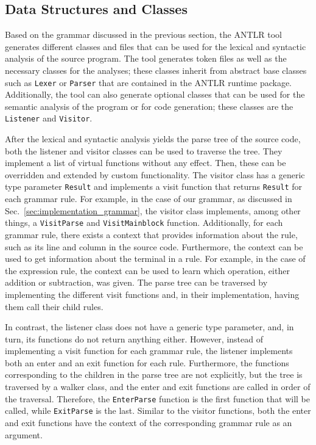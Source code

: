 \subsection{Data Structures and Classes}
\label{sec:implementation_syntax_dataStructuresClasses}
Based on the grammar discussed in the previous section, the ANTLR tool generates different classes and files that can be used for the lexical and syntactic analysis of the source program. The tool generates token files as well as the necessary classes for the analyses; these classes inherit from abstract base classes such as \texttt{Lexer} or \texttt{Parser} that are contained in the ANTLR runtime package. Additionally, the tool can also generate optional classes that can be used for the semantic analysis of the program or for code generation; these classes are the \texttt{Listener} and \texttt{Visitor}.

After the lexical and syntactic analysis yields the parse tree of the source code, both the listener and visitor classes can be used to traverse the tree. They implement a list of virtual functions without any effect. Then, these can be overridden and extended by custom functionality. The visitor class has a generic type parameter \texttt{Result} and implements a visit function that returns \texttt{Result} for each grammar rule. For example, in the case of our grammar, as discussed in Sec.~\ref{sec:implementation_grammar}, the visitor class implements, among other things, a \texttt{VisitParse} and \texttt{VisitMainblock} function.
Additionally, for each grammar rule, there exists a context that provides information about the rule, such as its line and column in the source code. Furthermore, the context can be used to get information about the terminal in a rule. For example, in the case of the expression rule, the context can be used to learn which operation, either addition or subtraction, was given. The parse tree can be traversed by implementing the different visit functions and, in their implementation, having them call their child rules.

In contrast, the listener class does not have a generic type parameter, and, in turn, its functions do not return anything either. However, instead of implementing a visit function for each grammar rule, the listener implements both an enter and an exit function for each rule. Furthermore, the functions corresponding to the children in the parse tree are not explicitly, but the tree is traversed by a walker class, and the enter and exit functions are called in order of the traversal. Therefore, the \texttt{EnterParse} function is the first function that will be called, while \texttt{ExitParse} is the last. Similar to the visitor functions, both the enter and exit functions have the context of the corresponding grammar rule as an argument. 

